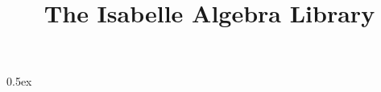\documentclass[11pt,a4paper]{article}
\begin{document}
\title{The Isabelle Algebra Library}
\maketitle

\tableofcontents

\parindent 0pt\parskip 0.5ex



%
%
\end{document}
